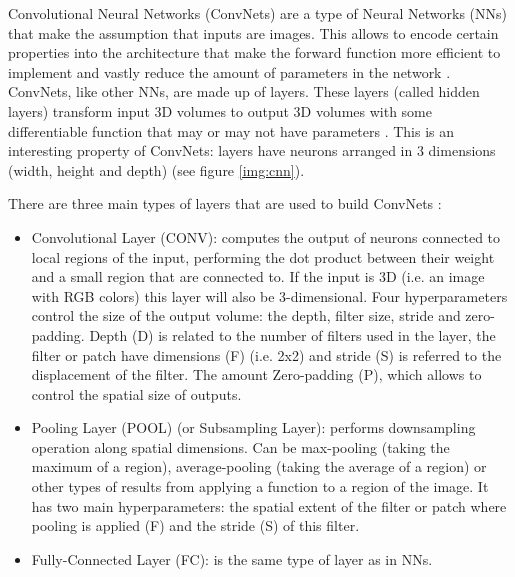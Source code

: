 \documentclass[]{article}
\begin{document}
Convolutional Neural Networks (ConvNets) are a type of Neural Networks (NNs) that make the assumption that inputs are images. This allows to encode certain properties into the architecture that make the forward function more efficient to implement and vastly reduce the amount of parameters in the network \cite{cs231convnets}.
ConvNets, like other NNs, are made up of layers. These layers (called hidden layers) transform input 3D volumes to output 3D volumes with some differentiable function that may or may not have parameters \cite{cs231convnets}. This is an interesting property of ConvNets: layers have neurons arranged in 3 dimensions (width, height and depth) (see figure \ref{img:cnn}). %

There are three main types of layers that are used to build ConvNets \cite{cs231convnets}: %
\begin{itemize}
	\item Convolutional Layer (CONV): computes the output of neurons connected to local regions of the input, performing the dot product between their weight and a small region that are connected to. If the input is 3D (i.e. an image with RGB colors) this layer will also be 3-dimensional. Four hyperparameters control the size of the output volume: the depth, filter size, stride and zero-padding. Depth (D) is related to the number of filters used in the layer, the filter or patch have dimensions (F) (i.e. 2x2) and stride (S) is referred to the displacement of the filter. The amount Zero-padding (P), which allows to control the spatial size of outputs.
	\item Pooling Layer (POOL) (or Subsampling Layer): performs downsampling operation along spatial dimensions. Can be max-pooling (taking the maximum of a region), average-pooling (taking the average of a region) or other types of results from applying a function to a region of the image. It has two main hyperparameters: the spatial extent of the filter or patch where pooling is applied (F) and the stride (S) of this filter.
	\item Fully-Connected Layer (FC): is the same type of layer as in NNs.
\end{itemize}
\end{document}

